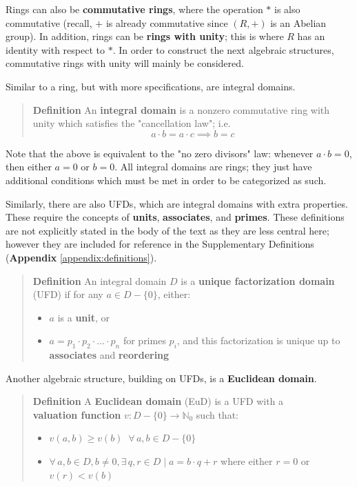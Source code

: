 \documentclass[letterpaper,12pt,titlepage,oneside,final]{book}
\newenvironment{defn}{\begin{quote}%
  \textbf{Definition }%
  \quad
}{%
\end{quote}%
}
\begin{document}
Rings can also be \textbf{commutative rings}, where the operation ${*}$ is also commutative (recall, ${+}$ is already commutative since ${(R, +)}$ is an Abelian group).  In addition, rings can be \textbf{rings with unity}; this is where ${R}$ has an identity with respect to ${*}$.  In order to construct the next algebraic structures, commutative rings with unity will mainly be considered.

Similar to a ring, but with more specifications, are integral domains.  

\begin{defn}\label{defn: Integral domain}
  An \textbf{integral domain} is a nonzero commutative ring with unity which satisfies the "cancellation law"; i.e. 
  \begin{equation*} 
    a \cdot b = a \cdot c \implies b = c
  \end{equation*}
\end{defn}
Note that the above is equivalent to the "no zero divisors" law: whenever ${a \cdot b = 0}$, then either ${a = 0}$ or ${b = 0}$.  All integral domains are rings; they just have additional conditions which must be met in order to be categorized as such.

Similarly, there are also UFDs, which are integral domains with extra properties.  These require the concepts of \textbf{units}, \textbf{associates}, and \textbf{primes}.  These definitions are not explicitly stated in the body of the text as they are less central here; however they are included for reference in the Supplementary Definitions (\textbf{Appendix} \ref{appendix:definitions}).

\begin{defn}\label{defn: Unique Factorization Domain}
  An integral domain ${D}$ is a \textbf{unique factorization domain} (UFD) if for any ${a \in D - \{0\}}$,  either: 
  \begin{itemize}
    \item ${a}$ is a \textbf{unit}, or
    \item ${a = p_1 \cdot p_2 \cdot \ldots \cdot p_n}$ for primes ${p_i}$, and this factorization is unique up to \textbf{associates} and \textbf{reordering}
  \end{itemize}
\end{defn}

Another algebraic structure, building on UFDs, is a \textbf{Euclidean domain}.

\begin{defn}\label{defn: Euclidean domain}
  A \textbf{Euclidean domain} (EuD) is a UFD with a \\ \textbf{valuation function} ${v : D - \{0\} \rightarrow \mathbb{N}_0}$ such that:
  \begin{itemize}
    \item ${v(a, b) \geq v(b) \;\; \forall \, a, b \in D - \{0\}}$
    \item ${\forall \, a, b \in D, b \neq 0, \exists \, q, r \in D \mid a = b \cdot q + r}$ where either ${r = 0}$ or ${v(r) < v(b)}$
  \end{itemize}
\end{defn}
\end{document}
